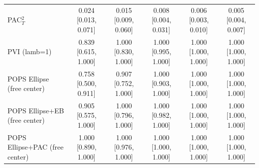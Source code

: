 \begin{tabular}{lccccc}
PAC$^2_T$ & 0.024 {\scriptsize[0.013, 0.071]} & 0.015 {\scriptsize[0.009, 0.060]} & 0.008 {\scriptsize[0.004, 0.031]} & 0.006 {\scriptsize[0.003, 0.010]} & 0.005 {\scriptsize[0.004, 0.007]} \\
PVI (lamb=1) & 0.839 {\scriptsize[0.615, 1.000]} & 1.000 {\scriptsize[0.830, 1.000]} & 1.000 {\scriptsize[0.995, 1.000]} & 1.000 {\scriptsize[1.000, 1.000]} & 1.000 {\scriptsize[1.000, 1.000]} \\
POPS Ellipse (free center) & 0.758 {\scriptsize[0.500, 0.911]} & 0.907 {\scriptsize[0.752, 1.000]} & 1.000 {\scriptsize[0.903, 1.000]} & 1.000 {\scriptsize[1.000, 1.000]} & 1.000 {\scriptsize[1.000, 1.000]} \\
POPS Ellipse+EB (free center) & 0.905 {\scriptsize[0.575, 1.000]} & 1.000 {\scriptsize[0.796, 1.000]} & 1.000 {\scriptsize[0.982, 1.000]} & 1.000 {\scriptsize[1.000, 1.000]} & 1.000 {\scriptsize[1.000, 1.000]} \\
POPS Ellipse+PAC (free center) & 1.000 {\scriptsize[0.890, 1.000]} & 1.000 {\scriptsize[0.976, 1.000]} & 1.000 {\scriptsize[1.000, 1.000]} & 1.000 {\scriptsize[1.000, 1.000]} & 1.000 {\scriptsize[1.000, 1.000]} \\
\bottomrule
\end{tabular}

